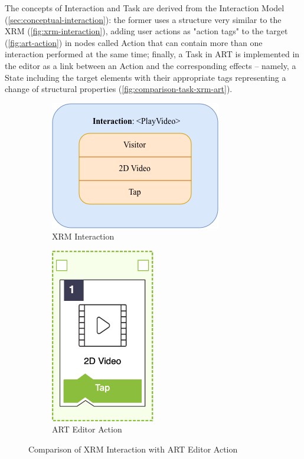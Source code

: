The concepts of Interaction and Task are derived from the Interaction Model (\autoref{sec:conceptual-interaction}): the former uses a structure very similar to the XRM (\autoref{fig:xrm-interaction}), adding user actions as "action tags" to the target (\autoref{fig:art-action}) in nodes called Action that can contain more than one interaction performed at the same time; finally, a Task in ART is implemented in the editor as a link between an Action and the corresponding effects -- namely, a State including the target elements with their appropriate tags representing a change of structural properties (\autoref{fig:comparison-task-xrm-art}).
\begin{figure}[h]
    \begin{subfigure}{0.5\textwidth}
        \centering
        \includegraphics[width=0.85\columnwidth]{Figures/Editor/xrm-interaction.png}
        \caption{XRM Interaction}
        \label{fig:xrm-interaction}
    \end{subfigure}
    \begin{subfigure}{0.45\textwidth}
        \centering
        \includegraphics[width=0.5\textwidth]{Figures/Editor/art-action.png}
        \caption{ART Editor Action}
        \label{fig:art-action}
    \end{subfigure}
    \caption{Comparison of XRM Interaction with ART Editor Action}
    \label{fig:comparison-action-xrm-art}
\end{figure}


